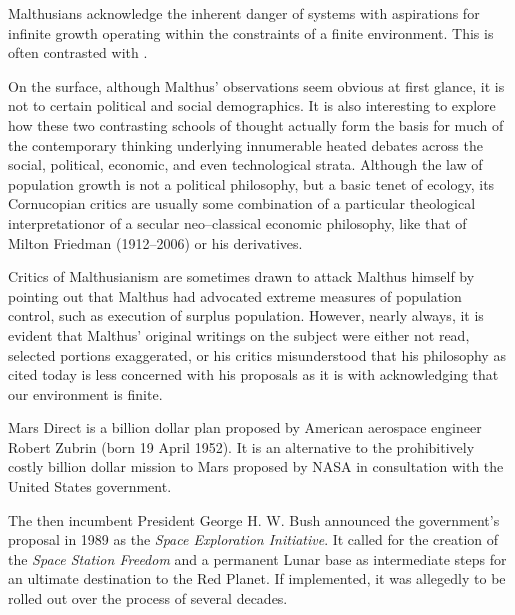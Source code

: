     {}

Malthusians acknowledge the inherent danger of systems with aspirations for infinite growth operating within the constraints of a finite environment. This is often contrasted with \about[Cornucopianism].

On the surface, although Malthus' observations seem obvious at first glance, it is not to certain political and social demographics. It is also interesting to explore how these two contrasting schools of thought actually form the basis for much of the contemporary thinking underlying innumerable heated debates across the social, political, economic, and even technological strata. Although the law of population growth is not a political philosophy, but a basic tenet of ecology, its Cornucopian critics are usually some combination of a particular theological interpretation or of a secular neo--classical economic philosophy, like that of Milton Friedman (1912--2006) or his derivatives.

Critics of Malthusianism are sometimes drawn to attack Malthus himself by pointing out that Malthus had advocated extreme measures of population control, such as execution of surplus population. However, nearly always, it is evident that Malthus' original writings on the subject were either not read, selected portions exaggerated, or his critics misunderstood that his philosophy as cited today is less concerned with his proposals as it is with acknowledging that our environment is finite.

Mars Direct is a  billion dollar plan proposed by American aerospace engineer Robert Zubrin (born 19 April 1952). It is an alternative to the prohibitively costly  billion dollar mission to Mars proposed by NASA in consultation with the United States government.

The then incumbent President George H. W. Bush announced the government's proposal in 1989 as the {\it Space Exploration Initiative}. It called for the creation of the {\it Space Station Freedom} and a permanent Lunar base as intermediate steps for an ultimate destination to the Red Planet. If implemented, it was allegedly to be rolled out over the process of several decades.

